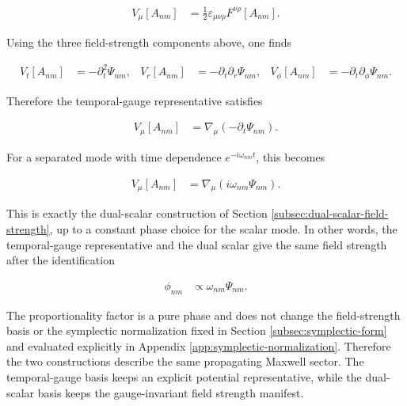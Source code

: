 \begin{align}
V_{\mu}[A_{nm}]&=\frac{1}{2}\varepsilon_{\mu\nu\rho}F^{\nu\rho}[A_{nm}].
\end{align}

Using the three field-strength components above, one finds

\begin{align}
V_{t}[A_{nm}]&=-\partial_{t}^{2}\Psi_{nm}, &
V_{r}[A_{nm}]&=-\partial_{t}\partial_{r}\Psi_{nm}, &
V_{\phi}[A_{nm}]&=-\partial_{t}\partial_{\phi}\Psi_{nm}.
\end{align}

Therefore the temporal-gauge representative satisfies

\begin{align}
V_{\mu}[A_{nm}]&=\nabla_{\mu}\left(-\partial_{t}\Psi_{nm}\right).
\end{align}

For a separated mode with time dependence $e^{-i\omega_{nm}t}$, this becomes

\begin{align}
V_{\mu}[A_{nm}]&=\nabla_{\mu}\left(i\omega_{nm}\Psi_{nm}\right).
\end{align}

This is exactly the dual-scalar construction of Section \ref{subsec:dual-scalar-field-strength}, up to a constant phase choice for the scalar mode. In other words, the temporal-gauge representative and the dual scalar give the same field strength after the identification

\begin{align}
\phi_{nm}&\propto\omega_{nm}\Psi_{nm}.
\end{align}

The proportionality factor is a pure phase and does not change the field-strength basis or the symplectic normalization fixed in Section \ref{subsec:symplectic-form} and evaluated explicitly in Appendix \ref{app:symplectic-normalization}. Therefore the two constructions describe the same propagating Maxwell sector. The temporal-gauge basis keeps an explicit potential representative, while the dual-scalar basis keeps the gauge-invariant field strength manifest.
